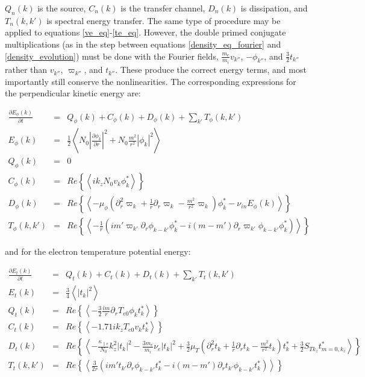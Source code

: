 \documentclass[12pt]{article}
\def\beqar{\begin{eqnarray}}
\def\eeqar{\end{eqnarray}}
\newcommand{\pdiff}[2]{\frac{\partial#1}{\partial#2}}
\newcommand{\pdr}{\partial_r}
\newcommand{\pdrr}{\partial^2_r}
\newcommand{\nue}{\nu_{e}}
\newcommand{\nuin}{\nu_{in}}
\newcommand{\kpe}{\kappa_{\parallel e}}
\newcommand{\fmei}{\frac{m_e}{m_i}}
\begin{document}
$Q_n(k)$ is the source, $C_n(k)$ is the transfer channel, $D_n(k)$ is dissipation, and $T_n(k,k')$ is spectral energy transfer.
The same type of procedure may be applied to equations \ref{ve_eq}-\ref{te_eq}. 
However, the double primed conjugate multiplications (as in the step between equations \ref{density_eq_fourier} and 
\ref{density_evolution}) must be done with the Fourier fields, $\fmei v_{k''}$,  $- \phi_{k''}$, and $\frac{3}{2} t_{k''}$ rather than 
$v_{k''}$, $\varpi_{k''}$, and $t_{k''}$.
These produce the correct energy terms, and most importantly still conserve the nonlinearities. The corresponding expressions for the perpendicular kinetic energy are:

\beqar
\label{Fourier_phi_evolution}
\pdiff{E_\phi(k)}{t} & = & Q_\phi(k) + C_\phi(k) + D_\phi(k) + \sum_{k'} T_\phi(k,k') \\
E_\phi(k) & = & \frac{1}{2} \left<  N_0 \left| \pdiff{\phi_k}{r} \right|^2 + N_0 \frac{m^2}{r^2} |\phi_k|^2  \right>\\
Q_\phi(k) & = & 0 \\
C_\phi(k) & = & Re \left\{ \left< i k_z N_0 v_k \phi_k^* \right> \right\} \\
D_\phi(k) & = & Re \left\{ \left<  - \mu_\phi( \pdrr \varpi_k + \frac{1}{r} \pdr \varpi_k - \frac{m^2}{r^2} \varpi_k) \phi_k^* -  \nuin E_\phi(k)\right> \right\} \\
T_\phi(k,k') & = & Re \left\{ \left< - \frac{1}{r} \left( i m' \varpi_{k'} \pdr \phi_{k-k'} \phi_k^*  - i (m - m') \pdr \varpi_{k'} \phi_{k-k'} \phi_k^*        \right) \right> \right\}
\eeqar

and for the electron temperature potential energy:

\beqar
\label{Fourier_te_evolution}
\pdiff{E_t(k)}{t} & = & Q_t(k) + C_t(k) + D_t(k) + \sum_{k'} T_t(k,k') \\
E_t(k) & = & \frac{3}{4} \left< |t_k|^2  \right> \\
Q_t(k) & = & Re \left\{ \left< - \frac{3}{2} \frac{i m}{r} \pdr T_{e0} \phi_k t_k^* \right> \right\} \\
C_t(k) & = & Re \left\{ \left<  - 1.71 i k_z T_{e0} v_k t_k^* \right> \right\} \\
D_t(k) & = & Re \left\{ \left< -\frac{\kpe}{N_0} k_z^2 |t_k|^2  - \frac{3 m_e}{m_i} \nue |t_k|^2 
+ \frac{3}{2} \mu_T( \pdrr t_k + \frac{1}{r} \pdr t_k - \frac{m^2}{r^2} t_k) t_k^*  + \frac{3}{2} S_{T k_z} t_{m=0,k_z}^*  \right> \right\} \\
T_t(k,k') & = & Re \left\{ \left< \frac{3}{2 r} \left( i m' t_{k'} \pdr \phi_{k-k'} t_k^*  - i (m - m') \pdr t_{k'} \phi_{k-k'} t_k^*        \right) \right> \right\}
\eeqar
\end{document}
